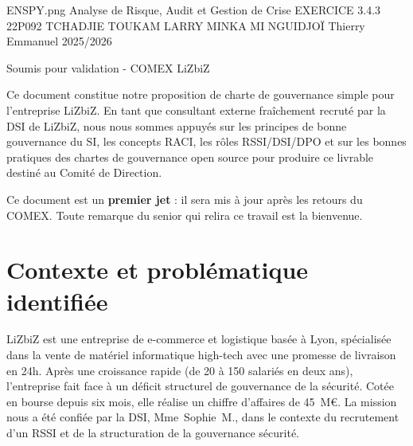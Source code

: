 \documentclass[12pt,a4paper]{article}
\begin{document}

\pagegardeENSP
    {ENSPY.png}
    {Analyse de Risque, Audit et Gestion de Crise}
    {EXERCICE 3.4.3}
    {22P092}
    {TCHADJIE TOUKAM LARRY}
    {}
    {MINKA MI NGUIDJOÏ Thierry Emmanuel}
    {2025/2026}

%
    {Soumis pour validation - COMEX LiZbiZ}

\vspace{0.6cm}

\begin{boxnote}
Ce document constitue notre proposition de charte de gouvernance simple pour l'entreprise LiZbiZ.
En tant que consultant externe fraîchement recruté par la DSI de LiZbiZ,
nous nous sommes appuyés sur les principes de bonne gouvernance du SI, les concepts RACI, les rôles RSSI/DSI/DPO et sur
les bonnes pratiques des chartes de gouvernance open source pour produire
ce livrable destiné au Comité de Direction.

Ce document est un \textbf{premier jet} : il sera mis à jour après les
retours du COMEX. Toute remarque du senior qui relira ce travail est
la bienvenue.
\end{boxnote}

\vspace{0.5cm}

\tableofcontents

\newpage

\section{Contexte et problématique identifiée}

\begin{boxmission}
LiZbiZ est une entreprise de e-commerce et logistique basée à Lyon,
spécialisée dans la vente de matériel informatique high-tech avec une
promesse de livraison en 24h. Après une croissance rapide (de 20 à
150 salariés en deux ans), l'entreprise fait face à un déficit structurel
de gouvernance de la sécurité. Cotée en bourse depuis six mois, elle
réalise un chiffre d'affaires de 45~M€. La mission nous a été confiée
par la DSI, Mme~Sophie~M., dans le contexte du recrutement d'un RSSI et
de la structuration de la gouvernance sécurité.
\end{boxmission}
\end{document}

